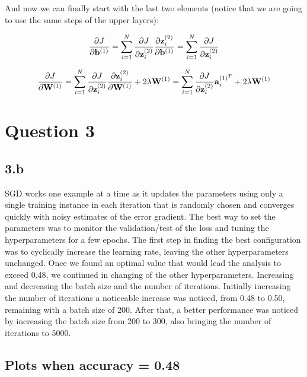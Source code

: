 \documentclass{article}
\DeclareRobustCommand{\vect}[1]{
  \ifcat#1\relax
    \boldsymbol{#1}
  \else
    \mathbf{#1}
  \fi}
\begin{document}
And now we can finally start with the last two elements (notice that we are going to use the same steps of the upper layers):

$$
\frac{\partial J}{\partial \vect{b}^{(1)}} = 
\sum_{i=1}^N\frac{\partial J}{\partial \vect{z}_i^{(2)}} \frac{\partial \vect{z}_i^{(2)}}{\partial \vect{b}^{(1)}} =  
\sum_{i=1}^N\frac{\partial J}{\partial \vect{z}_i^{(2)}}
$$

$$
\frac{\partial J}{\partial \vect{W}^{(1)}} = \sum_{i=1}^N\frac{\partial J}{\partial\vect{z}_i^{(2)}}  \frac{\partial \vect{z}_i^{(2)}}{\partial \vect{W}^{(1)}} + 2\lambda \vect{W}^{(1)} = \sum_{i=1}^N\frac{\partial J}{\partial\vect{z}_i^{(2)}} \vect{a}_i^{(1)^T}  + 2\lambda \vect{W}^{(1)} 
$$

\section*{Question 3}
\subsection*{3.b}

SGD works one example at a time as it updates the parameters using only a single training instance in each iteration that is randomly chosen and converges quickly with noisy estimates of the error gradient. The best way to set the parameters was to monitor the validation/test of the loss and tuning the hyperparameters for a few epochs. The first step in finding the best configuration was to cyclically increase the learning rate, leaving the other hyperparameters unchanged. Once we found an optimal value that would lead the analysis to exceed 0.48, we continued in changing of the other hyperparameters. Increasing and decreasing the batch size and the number of iterations. Initially increasing the number of iterations a noticeable increase was noticed, from 0.48 to 0.50, remaining with a batch size of 200. After that, a better performance was noticed by increasing the batch size from 200 to 300, also bringing the number of iterations to 5000.
\newpage
\subsection*{Plots when accuracy = 0.48}

\begin{figure}[!h]
	\begin{center}
		\hspace{1mm}
	
		
		
	\end{center}
	\captionsetup{justification=raggedright,margin=1cm}
	\label{gr}
\end{figure}
\end{document}

